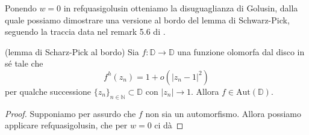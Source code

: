 Ponendo $w=0$ in ref{quasigolusin} otteniamo la disuguaglianza di Golusin, dalla quale possiamo dimostrare una versione al bordo del lemma di Schwarz-Pick, seguendo la traccia data nel remark 5.6 di \cite{BKR}.

\begin{thm} \label{boundary_schwarz_pick}
  (lemma di Scharz-Pick al bordo) Sia $f:\mathbb{D} \longrightarrow \mathbb{D}$ una funzione olomorfa dal disco in sé tale che
  \begin{equation}
    f^h(z_n)=1+o(|z_n-1|^2)
  \end{equation}
  per qualche successione $\{z_n\}_{n \in \mathbb{N}} \subset \mathbb{D}$ con $|z_n| \longrightarrow 1$. Allora $f \in \text{Aut}(\mathbb{D})$.
\end{thm}


\begin{proof}
  Supponiamo per assurdo che $f$ non sia un automorfismo. Allora possiamo applicare ref{quasigolusin}, che per $w=0$ ci dà
\end{proof}
